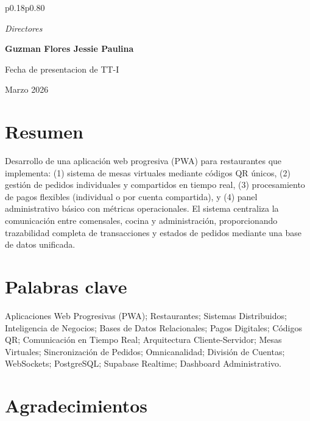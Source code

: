 \documentclass[12pt]{report}
\begin{document}
\begin{tabular}{p{0.18\textwidth}p{0.80\textwidth}}
\begin{minipage}[t][0.92\textheight][t]{\linewidth}
    \vspace{1.0cm}
    {\fontsize{14}{17}\selectfont\itshape Directores\par}
    \vspace{0.2cm}
    {\fontsize{14}{17}\selectfont\bfseries Guzman Flores Jessie Paulina\par}

    \vfill
    {\fontsize{12}{15}\selectfont Fecha de presentacion de TT-I\par}
    \vspace{0.15cm}
    {\fontsize{12}{15}\selectfont Marzo 2026\par}
  \end{minipage}
\end{tabular}

\newpage
\section*{Resumen}
Desarrollo de una aplicación web progresiva (PWA) para restaurantes que implementa: (1) sistema de mesas virtuales mediante códigos QR únicos, (2) gestión de pedidos individuales y compartidos en tiempo real, (3) procesamiento de pagos flexibles (individual o por cuenta compartida), y (4) panel administrativo básico con métricas operacionales. El sistema centraliza la comunicación entre comensales, cocina y administración, proporcionando trazabilidad completa de transacciones y estados de pedidos mediante una base de datos unificada.

\section*{Palabras clave}
Aplicaciones Web Progresivas (PWA); Restaurantes; Sistemas Distribuidos; Inteligencia de Negocios; Bases de Datos Relacionales; Pagos Digitales; Códigos QR; Comunicación en Tiempo Real; Arquitectura Cliente-Servidor; Mesas Virtuales; Sincronización de Pedidos; Omnicanalidad; División de Cuentas; WebSockets; PostgreSQL; Supabase Realtime; Dashboard Administrativo.

\newpage
\section*{Agradecimientos}
\mbox{}

\newpage
\tableofcontents
\end{document}
